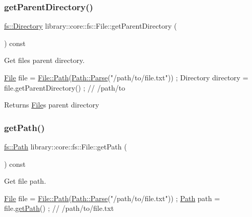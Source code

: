 \subsubsection{\texorpdfstring{get\+Parent\+Directory()}{getParentDirectory()}}
{\footnotesize\ttfamily \hyperlink{classlibrary_1_1core_1_1fs_1_1_directory}{fs\+::\+Directory} library\+::core\+::fs\+::\+File\+::get\+Parent\+Directory (\begin{DoxyParamCaption}{ }\end{DoxyParamCaption}) const}



Get file\textquotesingle{}s parent directory. 


\begin{DoxyCode}
\hyperlink{classlibrary_1_1core_1_1fs_1_1_file_a6f3f0d79545ac9984c6f49432f0c6c39}{File} file = \hyperlink{classlibrary_1_1core_1_1fs_1_1_file_a72d6cdf8bb7e299889c6149e2b8a6cc7}{File::Path}(\hyperlink{classlibrary_1_1core_1_1fs_1_1_path_a6ba644b6609507e724c217bf2020f5ae}{Path::Parse}(\textcolor{stringliteral}{"/path/to/file.txt"})) ;
Directory directory = file.getParentDirectory() ; \textcolor{comment}{// /path/to}
\end{DoxyCode}


\begin{DoxyReturn}{Returns}
\hyperlink{classlibrary_1_1core_1_1fs_1_1_file}{File}\textquotesingle{}s parent directory 
\end{DoxyReturn}
\mbox{\label{classlibrary_1_1core_1_1fs_1_1_file_a70b1380ff844adf37a481bbdb46d11a0}} 
\subsubsection{\texorpdfstring{get\+Path()}{getPath()}}
{\footnotesize\ttfamily \hyperlink{classlibrary_1_1core_1_1fs_1_1_path}{fs\+::\+Path} library\+::core\+::fs\+::\+File\+::get\+Path (\begin{DoxyParamCaption}{ }\end{DoxyParamCaption}) const}



Get file path. 


\begin{DoxyCode}
\hyperlink{classlibrary_1_1core_1_1fs_1_1_file_a6f3f0d79545ac9984c6f49432f0c6c39}{File} file = \hyperlink{classlibrary_1_1core_1_1fs_1_1_file_a72d6cdf8bb7e299889c6149e2b8a6cc7}{File::Path}(\hyperlink{classlibrary_1_1core_1_1fs_1_1_path_a6ba644b6609507e724c217bf2020f5ae}{Path::Parse}(\textcolor{stringliteral}{"/path/to/file.txt"})) ;
\hyperlink{classlibrary_1_1core_1_1fs_1_1_file_a72d6cdf8bb7e299889c6149e2b8a6cc7}{Path} path = file.\hyperlink{classlibrary_1_1core_1_1fs_1_1_file_a70b1380ff844adf37a481bbdb46d11a0}{getPath}() ; \textcolor{comment}{// /path/to/file.txt}
\end{DoxyCode}


